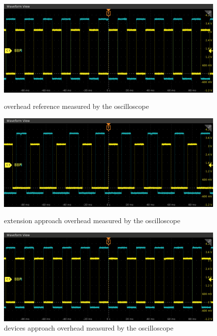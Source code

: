 \begin{figure}[!ht]
        \centering
        \includegraphics[scale=.4]{assets/reference-value-overhead-contiki-z1.png}
        \caption{overhead reference measured by the oscilloscope\label{fig:overhead-reference-value-contiki-z1}}

        \includegraphics[scale=.4]{assets/extension-framework-overhead-contiki-z1.png}
        \caption{extension approach overhead measured by the oscilloscope\label{fig:overhead-extension-contiki-z1}}

        \includegraphics[scale=.4]{assets/devices-framework-overhead-contiki-z1.png}
        \caption{devices approach overhead measured by the oscilloscope\label{fig:overhead-devices-contiki-z1}}
\end{figure}